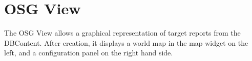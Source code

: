 \chapter{OSG View}
\label{sec:osg_view}


The OSG View allows a graphical representation of target reports from the DBContent. After creation, it displays a world map in the map widget on the left, and a configuration panel on the right hand side.
















